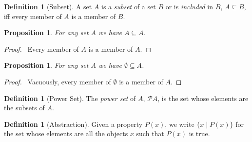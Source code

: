 \documentclass{article}
\let\qed\relax
\newtheorem{proposition}[axiom]{Proposition}
\theoremstyle{definition}
\newtheorem{definition}[axiom]{Definition}
\begin{document}
    \begin{definition}[Subset]
        A set $A$ is a \emph{subset} of a set $B$ or is \emph{included} in $B$, $A \subseteq B$, iff every
        member of $A$ is a member of $B$.
    \end{definition}

    \begin{proposition}
        For any set $A$ we have $A \subseteq A$.
    \end{proposition}

    \begin{proof}
        \pf\ Every member of $A$ is a member of $A$. \qed
    \end{proof}

    \begin{proposition}
        For any set $A$ we have $\emptyset \subseteq A$.
    \end{proposition}

    \begin{proof}
        \pf\ Vacuously, every member of $\emptyset$ is a member of $A$. \qed
    \end{proof}

    \begin{definition}[Power Set]
        The \emph{power set} of $A$, $\mathcal{P} A$, is the set whose elements are the subsets of $A$.
    \end{definition}

    \begin{definition}[Abstraction]
        Given a property $P(x)$, we write $\{ x \mid P(x) \}$ for the set whose elements are all the objects
        $x$ such that $P(x)$ is true.
    \end{definition}
\end{document}
